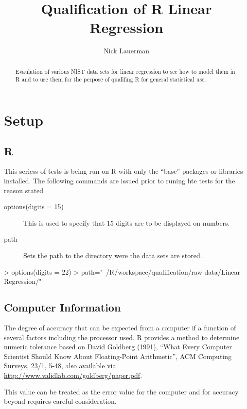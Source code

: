\documentclass[10pt]{article}
\title{Qualification of R Linear Regression}
\author{Nick Lauerman}
\begin{document}

\maketitle

\begin{abstract}
Evaulation of various NIST data sets for linear regression to see how to model
them in R and to use them for the perpose of qualifing R for general statistical
use.
\end{abstract}

\tableofcontents

\section{Setup}
\subsection{R}
This seriess of tests is being run on R with only the ``base'' packages or libraries
installed. The following commands are issued prior to runing hte tests for the 
reason stated

\begin{description}
   \item[options(digits = 15)] This is used to specify that 15 digits are to be displayed
   on numbers.
   \item[path] Sets the path to the directory were the data sets are stored.
\end{description}
\begin{Schunk}
\begin{Sinput}
> options(digits = 22)
> path="~/R/workspace/qualification/raw data/Linear Regression/"
\end{Sinput}
\end{Schunk}
\subsection{Computer Information}
The degree of accuracy  that can be expected from a computer if a function of several
factors including the processor used. R provides a method to determine 
numeric tolerance based on David Goldberg (1991), 
``What Every Computer Scientist Should Know About Floating-Point Arithmetic'', 
ACM Computing Surveys, 23/1, 5-48, also available via 
\url{http://www.validlab.com/goldberg/paper.pdf}.

This value can be treated as the error value for the computer and for accuracy 
beyond requires careful consideration.
\end{document}

